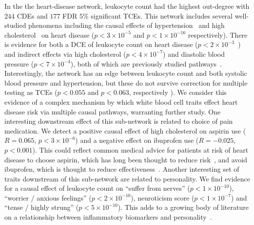 \documentclass{article}
\begin{document}
In the the heart-disease network, leukocyte count had the highest out-degree with $244$ CDEs
and $177$ FDR $5\%$ significant TCEs. This network  includes several well-studied phenomena
including the causal effects of hypertension~\cite{MacMahon1990} and high cholesterol~\cite{Castelli1992} on heart disease ($p < 3 \times 10^{-5}$ and $p < 1 \times 10^{-16}$ respectively). There is 
evidence for both a DCE of leukocyte count on heart disease
($p < 2 \times 10^{-3}$~\cite{Lee2001})
and indirect effects via high cholesterol ($p < 4 \times 10^{-7}$) and diastolic blood pressure
($p < 7 \times 10^{-4}$), both of which are previously studied pathways~\cite{Facchini1992}.
Interestingly, the network has an edge between 
leukocyte count and both systolic blood pressure and hypertension, but these do not survive correction
for multiple testing as TCEs ($p < 0.055$ and $p < 0.063$, respectively ). We consider this evidence of
a complex mechanism by which white blood cell traits effect heart disease risk via multiple causal pathways,
warranting further study. One interesting downstream effect of this  sub-network is related
to choice of pain medication. We detect a positive causal effect  of high cholesterol on aspirin use
($R = 0.065$, $p < 3 \times 10^{-6}$) and a negative effect on ibuprofen use ($R = -0.025$, $p < 0.001$).
This could reflect common medical advice for patients at risk of heart disease to choose aspirin,
which has long been thought to reduce risk~\cite{Sanmuganathan2001}, and avoid ibuprofen, which
is thought to reduce effectiveness~\cite{MacDonald2006}. Another interesting set of traits
downstream of this sub-network are related to personality. We find evidence for a causal effect of
leukocyte count on ``suffer from nerves'' ($p < 1 \times 10^{-10}$), ``worrier / anxious feelings'' 
($p < 2 \times 10^{-10}$), neuroticism score ($p < 1 \times 10^{-7}$) and ``tense / highly strung''
($p < 5 \times 10^{-10}$). This adds to a growing body of literature on a relationship between
inflammatory biomarkers and personality~\cite{Allen2017,Sutin2012}.
\end{document}

